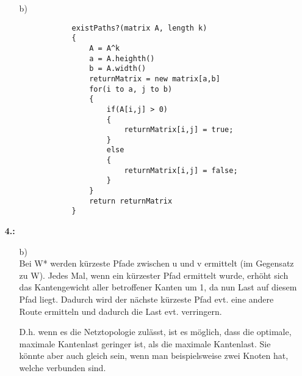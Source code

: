 \documentclass[a4paper,11pt,fleqn]{scrartcl}
\begin{document}
\begin{enumerate}
\begin{enumerate}
			\item[b)]
			\begin{verbatim}
			existPaths?(matrix A, length k)
			{
			    A = A^k
			    a = A.heighth()
			    b = A.width()
			    returnMatrix = new matrix[a,b]
			    for(i to a, j to b)
			    {
			        if(A[i,j] > 0)
			        {
			            returnMatrix[i,j] = true;
			        }
			        else
			        {
			            returnMatrix[i,j] = false;
			        }
			    }
			    return returnMatrix
			}
			\end{verbatim}
		\end{enumerate}
		\item[\textbf{4.:}]
		\begin{enumerate}
			\item[b)] \quad \\
			Bei W* werden kürzeste Pfade zwischen u und v ermittelt (im Gegensatz zu W). Jedes Mal, wenn ein kürzester Pfad ermittelt wurde, erhöht sich das Kantengewicht aller betroffener Kanten um 1, da nun Last auf diesem Pfad liegt. Dadurch wird der nächste kürzeste Pfad evt. eine andere Route ermitteln und dadurch die Last evt. verringern.

D.h. wenn es die Netztopologie zulässt, ist es möglich, dass die optimale, maximale Kantenlast geringer ist, als die maximale Kantenlast. Sie könnte aber auch gleich sein, wenn man beispielsweise zwei Knoten hat, welche verbunden sind.
		\end{enumerate}
	\end{enumerate}
\end{document}
